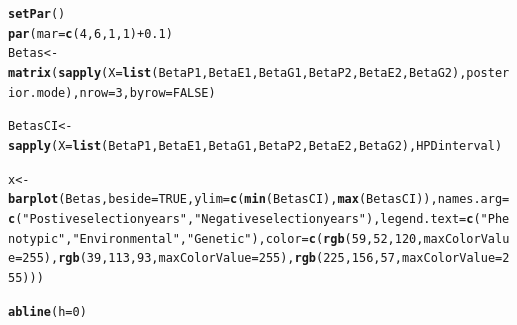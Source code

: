 \documentclass{article}\usepackage[]{graphicx}\usepackage[]{color}
\makeatletter
\newcommand{\hlnum}[1]{\textcolor[rgb]{0.686,0.059,0.569}{#1}}%
\newcommand{\hlstr}[1]{\textcolor[rgb]{0.192,0.494,0.8}{#1}}%
\newcommand{\hlopt}[1]{\textcolor[rgb]{0,0,0}{#1}}%
\newcommand{\hlstd}[1]{\textcolor[rgb]{0.345,0.345,0.345}{#1}}%
\newcommand{\hlkwb}[1]{\textcolor[rgb]{0.69,0.353,0.396}{#1}}%
\newcommand{\hlkwc}[1]{\textcolor[rgb]{0.333,0.667,0.333}{#1}}%
\newcommand{\hlkwd}[1]{\textcolor[rgb]{0.737,0.353,0.396}{\textbf{#1}}}%
\newenvironment{kframe}{%
 \def\at@end@of@kframe{}%
 \ifinner\ifhmode%
  \def\at@end@of@kframe{\end{minipage}}%
  \begin{minipage}{\columnwidth}%
 \fi\fi%
 \def\FrameCommand##1{\hskip\@totalleftmargin \hskip-\fboxsep
 \colorbox{shadecolor}{##1}\hskip-\fboxsep
     \hskip-\linewidth \hskip-\@totalleftmargin \hskip\columnwidth}%
 \MakeFramed {\advance\hsize-\width
   \@totalleftmargin\z@ \linewidth\hsize
   \@setminipage}}%
 {\par\unskip\endMakeFramed%
 \at@end@of@kframe}
\newenvironment{knitrout}{}{} %
\makeatother
\begin{document}
\begin{knitrout}
\color{fgcolor}\begin{kframe}
\begin{alltt}
\hlkwd{setPar}\hlstd{()}
\hlkwd{par}\hlstd{(}\hlkwc{mar}\hlstd{=}\hlkwd{c}\hlstd{(}\hlnum{4}\hlstd{,} \hlnum{6}\hlstd{,} \hlnum{1}\hlstd{,} \hlnum{1}\hlstd{)} \hlopt{+} \hlnum{0.1}\hlstd{)}
\hlstd{Betas} \hlkwb{<-} \hlkwd{matrix}\hlstd{(}\hlkwd{sapply}\hlstd{(}\hlkwc{X} \hlstd{=} \hlkwd{list}\hlstd{(BetaP1, BetaE1, BetaG1, BetaP2, BetaE2, BetaG2), posterior.mode),}\hlkwc{nrow} \hlstd{=}\hlnum{3}\hlstd{,} \hlkwc{byrow}\hlstd{=}\hlnum{FALSE}\hlstd{)}
\end{alltt}


{\ttfamily\noindent\bfseries\color{errorcolor}{\#\# Error in match.fun(FUN): object 'posterior.mode' not found}}\begin{alltt}
\hlstd{BetasCI} \hlkwb{<-} \hlkwd{sapply}\hlstd{(}\hlkwc{X} \hlstd{=} \hlkwd{list}\hlstd{(BetaP1, BetaE1, BetaG1, BetaP2, BetaE2, BetaG2), HPDinterval)}
\end{alltt}


{\ttfamily\noindent\bfseries\color{errorcolor}{\#\# Error in match.fun(FUN): object 'HPDinterval' not found}}\begin{alltt}
\hlstd{x} \hlkwb{<-} \hlkwd{barplot}\hlstd{(Betas,} \hlkwc{beside}\hlstd{=}\hlnum{TRUE}\hlstd{,} \hlkwc{ylim}\hlstd{=}\hlkwd{c}\hlstd{(}\hlkwd{min}\hlstd{(BetasCI),}\hlkwd{max}\hlstd{(BetasCI)),}\hlkwc{names.arg} \hlstd{=} \hlkwd{c}\hlstd{(}\hlstr{"Postive selection years"}\hlstd{,}\hlstr{"Negative selection years"}\hlstd{),} \hlkwc{legend.text} \hlstd{=} \hlkwd{c}\hlstd{(}\hlstr{"Phenotypic"}\hlstd{,}\hlstr{"Environmental"}\hlstd{,}\hlstr{"Genetic"}\hlstd{),} \hlkwc{color} \hlstd{=} \hlkwd{c}\hlstd{(}\hlkwd{rgb}\hlstd{(}\hlnum{59}\hlstd{,}\hlnum{52}\hlstd{,}\hlnum{120}\hlstd{,}\hlkwc{maxColorValue} \hlstd{=} \hlnum{255}\hlstd{),}\hlkwd{rgb}\hlstd{(}\hlnum{39}\hlstd{,}\hlnum{113}\hlstd{,}\hlnum{93}\hlstd{,}\hlkwc{maxColorValue} \hlstd{=} \hlnum{255}\hlstd{),}\hlkwd{rgb}\hlstd{(}\hlnum{225}\hlstd{,}\hlnum{156}\hlstd{,}\hlnum{57}\hlstd{,}\hlkwc{maxColorValue} \hlstd{=} \hlnum{255}\hlstd{)))}
\end{alltt}


{\ttfamily\noindent\bfseries\color{errorcolor}{\#\# Error in barplot(Betas, beside = TRUE, ylim = c(min(BetasCI), max(BetasCI)), : object 'Betas' not found}}\begin{alltt}
\hlkwd{abline}\hlstd{(}\hlkwc{h}\hlstd{=}\hlnum{0}\hlstd{)}
\end{alltt}



\end{kframe}
\end{knitrout}
\end{document}
